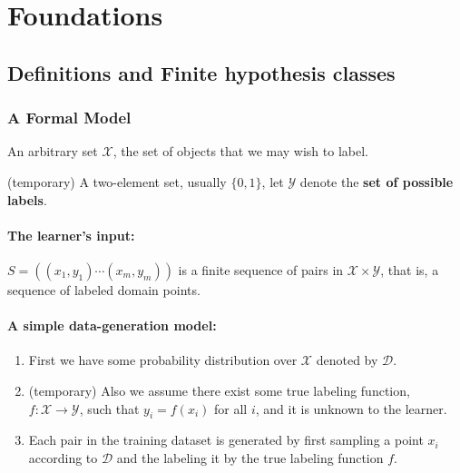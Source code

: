 \chapter{Foundations}
\section{Definitions and Finite hypothesis classes} \label{sec:}

\subsection{A Formal Model} \label{sec:}

\begin{definition}
    An arbitrary set $\mathcal{X}$, the set of objects that we may wish to label.
\end{definition}
\begin{definition}
    (temporary) A two-element set, usually $\{ 0 , 1 \}$, let $\mathcal{Y}$ denote the \textbf{set of possible labels}.
\end{definition}

\subsubsection{The learner's input:}
\begin{definition}
$S = ((x_1,y_1)\cdots (x_m,y_m))$ is a finite sequence of pairs in $\mathcal{X} \times \mathcal{Y}$, that is, a sequence of labeled domain points.
\end{definition}

\subsubsection{A simple data-generation model:}
\begin{enumerate}
    \item First we have some probability distribution over $\mathcal{X}$ denoted by $\mathcal{D}$.
    \item (temporary) Also we assume there exist some true labeling function, $f: \mathcal{X} \to \mathcal{Y}$, such that $y_i = f(x_i)$ for all $i$, and it is unknown to the learner.
    \item Each pair in the training dataset is generated by first sampling a point $x_i$ according to $\mathcal{D}$ and the labeling it by the true labeling function $f$.
\end{enumerate}

